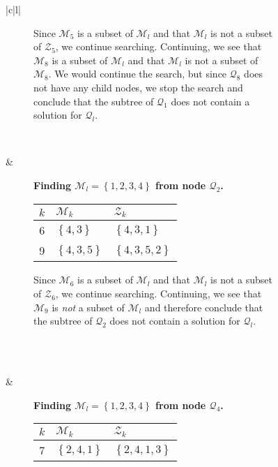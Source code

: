\begin{figure}[H]
\begin{tabular}[t]{|c|l|}
\begin{subfigure}[b]{0.64\textwidth}
        Since $\mathcal{M}_5$ is a subset of $\mathcal{M}_l$ and that
        $\mathcal{M}_l$ is not a subset of $\mathcal{Z}_5$, we continue
        searching. Continuing, we see that $\mathcal{M}_8$ is a subset of
        $\mathcal{M}_l$ and that $\mathcal{M}_l$ is not a subset of
        $\mathcal{M}_8$. We would continue the search, but since
        $\mathcal{Q}_8$ does not have any child nodes, we stop the search
        and conclude that the subtree of $\mathcal{Q}_1$ does not contain
        a solution for $\mathcal{Q}_l$.
    \end{subfigure}
    \\ \hline
    \begin{subfigure}[b]{0.35\textwidth}
        \centering
        
    \end{subfigure}
    & 
    \begin{subfigure}[b]{0.64\textwidth}
        \textbf{Finding $\mathcal{M}_l = \left\{{1,2,3,4}\right\}$ from node $\mathcal{Q}_2$.} \\
        \begin{tabular}{rll}
            $k$ & $\mathcal{M}_k$            & $\mathcal{Z}_k$ \\ \hline
            6        & $\left\{{4,3}\right\}$     & $\left\{{4,3,1}\right\}$ \\ 
            9        & $\left\{{4,3,5}\right\}$   & $\left\{{4,3,5,2}\right\}$ \\ 
        \end{tabular}

        Since $\mathcal{M}_6$ is a subset of $\mathcal{M}_l$ and that
        $\mathcal{M}_l$ is not a subset of $\mathcal{Z}_6$, we continue
        searching. Continuing, we see that $\mathcal{M}_9$ is \emph{not} a
        subset of $\mathcal{M}_l$ and therefore conclude that the subtree of
        $\mathcal{Q}_2$ does not contain a solution for $\mathcal{Q}_l$.
        \\
        \\
    \end{subfigure}
    \\ \hline
    \begin{subfigure}[b]{0.35\textwidth}
        \centering
        
    \end{subfigure}
    & 
    \begin{subfigure}[b]{0.64\textwidth}
        \textbf{Finding $\mathcal{M}_l = \left\{{1,2,3,4}\right\}$ from node $\mathcal{Q}_4$.} \\
        \begin{tabular}{rll}
            $k$ & $\mathcal{M}_k$            & $\mathcal{Z}_k$ \\ \hline
            7        & $\left\{{2,4,1}\right\}$   & $\left\{{2,4,1,3}\right\}$ \\ 
        \end{tabular}


\end{subfigure}
\end{tabular}
\end{figure}
